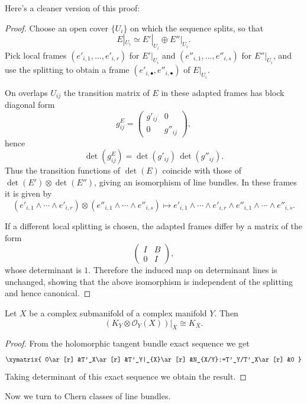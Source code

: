 \documentclass{book}
\begin{document}
\noindent
Here's a cleaner version of this proof:

\begin{proof}
Choose an open cover $\{U_i\}$ on which the
sequence splits, so that
\[
E|_{U_i}\simeq E'|_{U_i}\oplus E''|_{U_i}.
\]
Pick local frames $(e'_{i,1},\dots,e'_{i,r})$
for $E'|_{U_i}$ and
$(e''_{i,1},\dots,e''_{i,s})$ for
$E''|_{U_i}$, and use the splitting to obtain
a frame $(e'_{i,\bullet},e''_{i,\bullet})$ of
$E|_{U_i}$.

On overlaps $U_{ij}$ the transition matrix of
$E$ in these adapted frames has
block diagonal form
\[
g^E_{ij}=
\begin{pmatrix}
g'_{ij} & 0\\
0 & g''_{ij}
\end{pmatrix},
\]
hence
\[
\det(g^E_{ij})=\det(g'_{ij})\,\det(g''_{ij}).
\]
Thus the transition functions of $\det(E)$
coincide with those of
$\det(E')\otimes\det(E'')$, giving an
isomorphism of line bundles. In these
frames it is given by
\[
(e'_{i,1}\wedge\cdots\wedge e'_{i,r})\otimes
(e''_{i,1}\wedge\cdots\wedge e''_{i,s})
\longmapsto
e'_{i,1}\wedge\cdots\wedge e'_{i,r}\wedge
e''_{i,1}\wedge\cdots\wedge e''_{i,s}.
\]

If a different local splitting is chosen, the
adapted frames differ by a
matrix of the form
\[
\begin{pmatrix}
I & B\\
0 & I
\end{pmatrix},
\]
whose determinant is $1$. Therefore the
induced map on determinant lines is
unchanged, showing that the above isomorphism
is independent of the splitting
and hence canonical.
\end{proof}

\begin{theorem}
\label{theorem-adjunction-ii}
Let $X$ be a complex submanifold of a complex
manifold $Y$.
Then
\begin{equation}
\label{equation-adjunction-ii}
(K_Y\otimes \mathcal{O}_Y(X))|_{X}\cong K_X.
\end{equation}
\end{theorem}

\begin{proof}
From the holomorphic tangent bundle exact
sequence we get
$$
\xymatrix{
0\ar[r]
&T'_X\ar[r]
&T'_Y|_{X}\ar[r]
&N_{X/Y}:=T'_Y/T'_X\ar[r]
&0
}
$$
Taking determinant of this exact sequence we
obtain the result.
\end{proof}


\medskip\noindent
Now we turn to Chern classes of line bundles.
\end{document}
